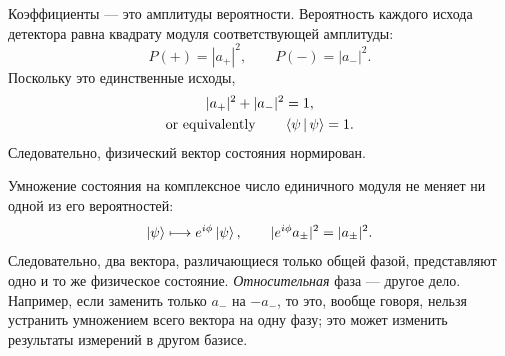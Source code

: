 Коэффициенты — это амплитуды вероятности. Вероятность каждого исхода детектора равна квадрату модуля соответствующей амплитуды:
\begin{equation}
  P(+)=|a_+|^2,
  \qquad
  P(-)=|a_-|^2.
  \label{eq:l02-born-rule}
\end{equation}
Поскольку это единственные исходы,
\begin{equation}
  \begin{gathered}
    |a_+|^2+|a_-|^2=1,\\
    \text{or equivalently}\qquad \left\langle\psi\,\middle|\,\psi\right\rangle=1.
  \end{gathered}
  \label{eq:l02-normalization}
\end{equation}
Следовательно, физический вектор состояния нормирован.

\begin{classroomqa}
\end{classroomqa}

Умножение состояния на комплексное число единичного модуля не меняет ни одной из его вероятностей:
\begin{equation}
  \left\lvert\psi\right\rangle\longmapsto e^{i\phi}\left\lvert\psi\right\rangle,
  \qquad
  |e^{i\phi}a_\pm|^2=|a_\pm|^2.
  \label{eq:l02-global-phase}
\end{equation}
Следовательно, два вектора, различающиеся только общей фазой, представляют одно и то же физическое состояние. \emph{Относительная} фаза — другое дело. Например, если заменить только \(a_-\) на \(-a_-\), то это, вообще говоря, нельзя устранить умножением всего вектора на одну фазу; это может изменить результаты измерений в другом базисе.

\begin{classroomqa}
\end{classroomqa}

